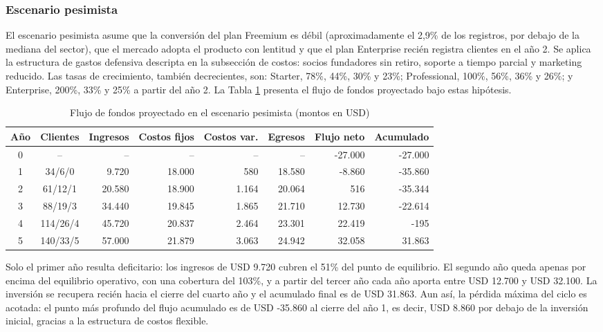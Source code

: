 \subsubsection{Escenario pesimista}

El escenario pesimista asume que la conversión del plan Freemium es débil (aproximadamente el 2,9\% de los registros, por debajo de la mediana del sector), que el mercado adopta el producto con lentitud y que el plan Enterprise recién registra clientes en el año 2. Se aplica la estructura de gastos defensiva descripta en la subsección de costos: socios fundadores sin retiro, soporte a tiempo parcial y marketing reducido. Las tasas de crecimiento, también decrecientes, son: Starter, 78\%, 44\%, 30\% y 23\%; Professional, 100\%, 56\%, 36\% y 26\%; y Enterprise, 200\%, 33\% y 25\% a partir del año 2. La Tabla \ref{tab:flujo-pesimista} presenta el flujo de fondos proyectado bajo estas hipótesis.

\begin{table}[H]
\centering
\footnotesize
\begin{tabular}{c c r r r r r r}
\hline
Año & Clientes & Ingresos & Costos fijos & Costos var. & Egresos & Flujo neto & Acumulado \\
\hline
0 & -- & -- & -- & -- & -- & -27.000 & -27.000 \\
1 & 34/6/0 & 9.720 & 18.000 & 580 & 18.580 & -8.860 & -35.860 \\
2 & 61/12/1 & 20.580 & 18.900 & 1.164 & 20.064 & 516 & -35.344 \\
3 & 88/19/3 & 34.440 & 19.845 & 1.865 & 21.710 & 12.730 & -22.614 \\
4 & 114/26/4 & 45.720 & 20.837 & 2.464 & 23.301 & 22.419 & -195 \\
5 & 140/33/5 & 57.000 & 21.879 & 3.063 & 24.942 & 32.058 & 31.863 \\
\hline
\end{tabular}
\caption{Flujo de fondos proyectado en el escenario pesimista (montos en USD)}
\label{tab:flujo-pesimista}
\end{table}

Solo el primer año resulta deficitario: los ingresos de USD 9.720 cubren el 51\% del punto de equilibrio. El segundo año queda apenas por encima del equilibrio operativo, con una cobertura del 103\%, y a partir del tercer año cada año aporta entre USD 12.700 y USD 32.100. La inversión se recupera recién hacia el cierre del cuarto año y el acumulado final es de USD 31.863. Aun así, la pérdida máxima del ciclo es acotada: el punto más profundo del flujo acumulado es de USD -35.860 al cierre del año 1, es decir, USD 8.860 por debajo de la inversión inicial, gracias a la estructura de costos flexible.

